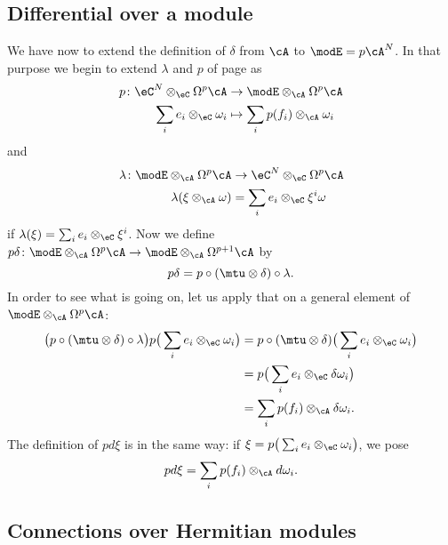 \subsection{Differential over a module}

We have now to extend the definition of $\delta$ from $\cA$ to $\modE=p\cA^N$. In that purpose we begin to extend $\lambda$ and $p$ of page \pageref{PgdeflambdaMod} as
\begin{equation}
\begin{aligned}
 p\colon \eC^N\otimes_{\eC}\Omega^p\cA&\to \modE\otimes_{\cA}\Omega^p\cA \\ 
   \sum_{i}e_i\otimes_{\eC}\omega_i&\mapsto \sum_ip(f_i)\otimes_{\cA}\omega_i 
\end{aligned}
\end{equation}
and
\begin{equation}
\begin{aligned}
 \lambda\colon \modE\otimes_{\cA}\Omega^p\cA&\to \eC^N\otimes_{\eC}\Omega^p\cA \\ 
   \lambda(\xi\otimes_{\cA}\omega)&=\sum_i e_i\otimes_{\eC}\xi^i\omega
\end{aligned}
\end{equation}
if $\lambda(\xi)=\sum_ie_i\otimes_{\eC}\xi^i$. Now we define $p\delta\colon\modE\otimes_{\cA}\Omega^p\cA\to \modE\otimes_{\cA}\Omega^{p+1}\cA$ by
\[ 
  p\delta=p\circ(\mtu\otimes\delta)\circ\lambda.
\]
In order to see what is going on, let us apply that on a general element of $\modE\otimes_{\cA}\Omega^p\cA$:
\begin{align*}
\big( p\circ(\mtu\otimes\delta)\circ\lambda \big)p\big( \sum_ie_i\otimes_{\eC}\omega_i \big)	&=p\circ(\mtu\otimes\delta)\big( \sum_ie_i\otimes_{\eC}\omega_i \big)\\
			&=p\big( \sum_ie_i\otimes_{\eC}\delta\omega_i \big)\\
			&=\sum_ip(f_i)\otimes_{\cA}\delta\omega_i.
\end{align*}
The definition of $pd\xi$ is in the same way: if $\xi=p\big( \sum_ie_i\otimes_{\eC}\omega_i \big)$, we pose
\begin{equation}
pd\xi=\sum_ip(f_i)\otimes_{\cA}d\omega_i.
\end{equation}



\subsection{Connections over Hermitian modules}

